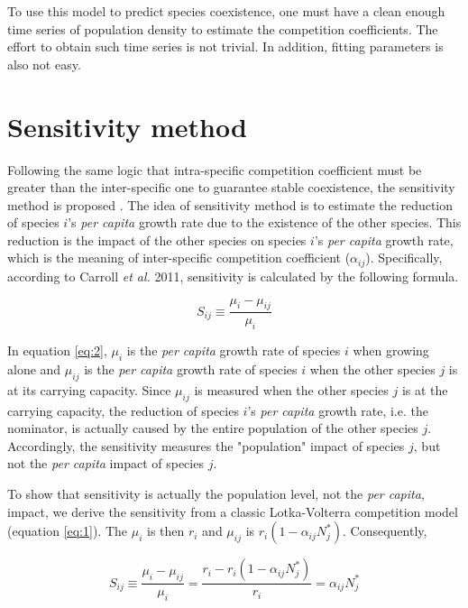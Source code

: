 \documentclass[fleqn]{article}
\begin{document}
To use this model to predict species coexistence, one must have a clean enough time series of population density to estimate the competition coefficients. The effort to obtain such time series is not trivial. In addition, fitting parameters is also not easy. 

\newpage
\section{Sensitivity method}

Following the same logic that intra-specific competition coefficient must be greater than the inter-specific one to guarantee stable coexistence, the sensitivity method is proposed \cite{Carroll2011}. The idea of sensitivity method is to estimate the reduction of species $i$'s \textit{per capita} growth rate due to the existence of the other species. This reduction is the impact of the other species on species $i$'s \textit{per capita} growth rate, which is the meaning of inter-specific competition coefficient ($\alpha_{ij}$). Specifically, according to Carroll \textit{et al.} 2011, sensitivity is calculated by the following formula. 

\begin{equation}\label{eq:2}
S_{ij} \equiv \frac{\mu_{i}-\mu_{ij}}{\mu_{i}}
\end{equation}

\noindent In equation \ref{eq:2}, $\mu_i$ is the \textit{per capita} growth rate of species $i$ when growing alone and $\mu_{ij}$ is the \textit{per capita} growth rate of species $i$ when the other species $j$ is at its carrying capacity. Since $\mu_{ij}$ is measured when the other species $j$ is at the carrying capacity, the reduction of species $i$'s \textit{per capita} growth rate, i.e. the nominator, is actually caused by the entire population of the other species $j$. Accordingly, the sensitivity measures the "population" impact of species $j$, but not the \textit{per capita} impact of species $j$. 

To show that sensitivity is actually the population level, not the \textit{per capita}, impact, we derive the sensitivity from a classic Lotka-Volterra competition model (equation \ref{eq:1}). The $\mu_{i}$ is then $r_i$ and $\mu_{ij}$ is $r_i(1-\alpha_{ij}N^*_j)$. Consequently, 

\begin{equation}\label{eq:3}
S_{ij} \equiv \frac{\mu_{i}-\mu_{ij}}{\mu_{i}} = \frac{r_i-r_i(1-\alpha_{ij}N^*_j)}{r_i} = \alpha_{ij}N^*_j
\end{equation}
\end{document}
